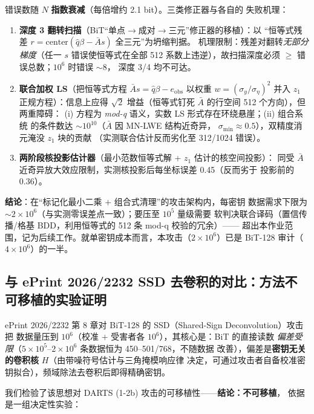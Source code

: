 \documentclass[UTF8,11pt,a4paper]{ctexart}
\begin{document}
\noindent 错误数随 $N$ \textbf{指数衰减}（每倍增约 2.1 bit）。三类修正器与各自的
失败机理：

\begin{enumerate}
\item \textbf{深度 3 翻转扫描}（BiT``单点$\to$成对$\to$三元''修正器的移植）：以
      ``恒等式残差 $r=\mathrm{center}(\hat q\beta-\bar As)$ 全三元''为坍缩判据。
      机理限制：残差对翻转\emph{无部分梯度}（任一 $s$ 错误使恒等式在全部 512
      系数上违逆），故扫描深度必须 $\ge$ 错误总数；$10^6$ 时错误 $\sim$8，
      深度 3/4 均不可达。
\item \textbf{联合加权 LS}（把恒等式方程 $\bar As=\hat q\beta-e_{\mathrm{obs}}$
      以权重 $w=(\sigma_y/\sigma_\eta)^2$ 并入 $z_1$ 正规方程）：信息上应得
      $\sqrt2$ 增益（恒等式钉死 $\bar A$ 的行空间 512 个方向），但两重障碍：
      (i) 方程为 \emph{mod-q} 语义，实数 LS 形式存在环绕悬崖；(ii) 组合系统
      的条件数达 $\sim10^{10}$（$\bar A$ 因 MN-LWE 结构近奇异，
      $\sigma_{\min}\approx0.5$），双精度消元淹没 $z_1$ 块的贡献
      （实测联合估计反而劣化至 312/1024 错误）。
\item \textbf{两阶段核投影估计器}（最小范数恒等式解 + $z_1$ 估计的核空间投影）：
      同受 $\bar A$ 近奇异放大效应限制，实测核投影后每坐标误差 0.45（反而劣于
      投影前的 0.36）。
\end{enumerate}

\noindent \textbf{结论}：在``标记化最小二乘 $+$ 组合式清理''的攻击架构内，每密钥
数据需求下限为 $\sim2\times10^6$（与实测零误差点一致）；要压至 $10^5$ 量级需要
软判决联合译码（置信传播/格基 BDD，利用恒等式的 512 条 mod-q 校验的冗余）——
超出本作业范围，记为后续工作。就单密钥成本而言，本攻击（$2\times10^6$）已是
BiT-128 审计（$4\times10^6$）的一半。

\subsection{与 ePrint 2026/2232 SSD 去卷积的对比：方法不可移植的实验证明}

ePrint 2026/2232 第 8 章对 BiT-128 的 SSD（Shared-Sign Deconvolution）攻击把
数据量压到 $10^6$（校准 $+$ 受害者各 $10^6$），其核心是：BiT 的直接读数
\emph{偏差受限}（$5\times10^5$--$2\times10^6$ 条数据恒为 450--501/768，不随数据
改善），偏差是\textbf{密钥无关的卷积核} $H$（由带噪符号估计与三角掩模响应律
决定，可通过攻击者自备校准密钥拟合），频域除法去卷积后即得精确密钥。

我们检验了该思想对 DARTS (1-2b) 攻击的可移植性——\textbf{结论：不可移植}，
依据是一组决定性实验：
\end{document}
